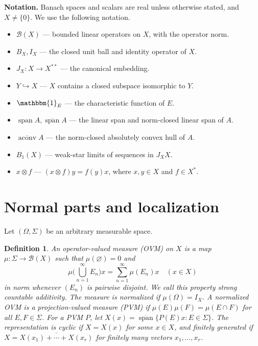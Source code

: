 \documentclass[11pt,leqno]{amsart}
\theoremstyle{compact}
\numberwithin{equation}{section}
\newtheorem{definition}[theorem]{Definition}
\theoremstyle{compactremark}
\theoremstyle{compact}
\def\cspan{\overline{\operatorname{span}}}
\newcommand{\1}{\mathbbm{1}}
\newcommand{\cB}{\mathcal{B}}
\begin{document}
\textbf{Notation.} Banach spaces and scalars are real unless otherwise stated, and $X\neq\{0\}$. We use the following notation.
\begin{itemize}[leftmargin=2em,itemsep=2pt,parsep=0pt,topsep=3pt,partopsep=0pt]
\item $\mathcal{B}(X)$ --- bounded linear operators on $X$, with the operator norm.
\item $B_X,I_X$ --- the closed unit ball and identity operator of $X$.
\item $J_X\colon X\to X^{**}$ --- the canonical embedding.
\item $Y\hookrightarrow X$ --- $X$ contains a closed subspace isomorphic to $Y$.
\item $\mathbbm{1}_E$ --- the characteristic function of $E$.
\item $\operatorname{span} A,\overline{\operatorname{span}} A$ --- the linear span and norm-closed linear span of $A$.
\item $\overline{\operatorname{aconv}}A$ --- the norm-closed absolutely convex hull of $A$.
\item $B_1(X)$ --- weak-star limits of sequences in $J_XX$.
\item $x\otimes f$ --- $(x\otimes f)y=f(y)x$, where $x,y\in X$ and $f\in X^*$.
\end{itemize}

\section{Normal parts and localization}\label{sec:normal-localization}

Let $(\Omega,\Sigma)$ be an arbitrary measurable space.

\begin{definition}
An \emph{operator-valued measure} (OVM) on $X$ is a map $\mu\colon\Sigma\to\cB(X)$ such that $\mu(\varnothing)=0$ and
\[
\mu\Big(\bigcup_{n=1}^{\infty}E_n\Big)x=\sum_{n=1}^{\infty}\mu(E_n)x\quad(x\in X)
\]
in norm whenever $(E_n)$ is pairwise disjoint. We call this property \emph{strong countable additivity}. The measure is \emph{normalized} if $\mu(\Omega)=I_X$. A normalized OVM is a \emph{projection-valued measure} (PVM) if $\mu(E)\mu(F)=\mu(E\cap F)$ for all $E,F\in\Sigma$. For a PVM $P$, let $X(x)=\cspan\{P(E)x:E\in\Sigma\}$. The representation is \emph{cyclic} if $X=X(x)$ for some $x\in X$, and \emph{finitely generated} if $X=\overline{X(x_1)+\cdots+X(x_r)}$ for finitely many vectors $x_1,\ldots,x_r$.
\end{definition}
\end{document}
